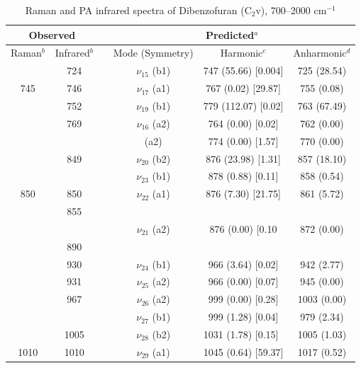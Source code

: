\begin{table}[H]
	\caption{Raman and PA infrared spectra of Dibenzofuran (C$_{2}$v), 700–2000 cm$^{-1}$}
	\begin{center}
		\begin{threeparttable}
			\begin{tabular}{c c c c c c}
				\hline
				\multicolumn{ 2}{c}{Observed} & \multicolumn{1}{c}{} & \multicolumn{ 3}{c}{Predicted$^{a}$} \\ \hline
				Raman$^{b}$ & \multicolumn{1}{c}{Infrared$^{b}$} &  & \multicolumn{1}{c}{Mode (Symmetry)} & \multicolumn{1}{c}{Harmonic$^{c}$} & Anharmonic$^{d}$ \\ 
 & 724 &  & $\nu_{15}$ (b1) & 747 (55.66) [0.004] & 725 (28.54) \\ 
 \multicolumn{1}{c}{745} & 746 &  & \multicolumn{1}{c}{ $\nu_{17}$ (a1)
 } & 767 (0.02) [29.87] & 755 (0.08) \\ 
 & 752 &  & $\nu_{19}$ (b1) & 779 (112.07) [0.02] & 763 (67.49) \\ 
 & 769 &  & $\nu_{16}$ (a2) & 764 (0.00) [0.02] & 762 (0.00) \\ 
 & \multicolumn{1}{c}{} &  & (a2) & 774 (0.00) [1.57] & 770 (0.00) \\ 
 & 849 &  & $\nu_{20}$ (b2) & 876 (23.98) [1.31] & 857 (18.10) \\ 
 & \multicolumn{1}{c}{} &  & $\nu_{23}$ (b1) & 878 (0.88) [0.11] & 858 (0.54) \\
 \multicolumn{1}{c}{850} & 850 &  & $\nu_{22}$ (a1) & 876 (7.30) [21.75] & 861 (5.72) \\ 
 & 855 &  &  &  &  \\ 
 & \multicolumn{1}{l}{} &  & $\nu_{21}$ (a2) & 876 (0.00) [0.10 & 872 (0.00) \\ 
 & 890 &  &  &  &  \\ 
 & 930 &  & $\nu_{24}$ (b1) & 966 (3.64) [0.02] & 942 (2.77) \\ 
 & 931 &  & $\nu_{25}$ (a2) & 966 (0.00) [0.07] & 945 (0.00) \\ 
 & \multicolumn{1}{c}{967} &  & $\nu_{26}$ (a2)& 999 (0.00) [0.28] & 1003 (0.00) \\
 &  &  & $\nu_{27}$ (b1) &  999 (1.28) [0.04] & 979 (2.34) \\ 
 & 1005 &  & \multicolumn{1}{c}{ $\nu_{28}$ (b2)} & \multicolumn{1}{l}{1031 (1.78) [0.15]} & 1005 (1.03) \\ 
 \multicolumn{1}{c}{1010} & 1010 &  & $\nu_{29}$ (a1)
 & 1045 (0.64) [59.37] & 1017 (0.52) \\ 

\end{tabular}
\end{threeparttable}
\end{center}
\end{table}
